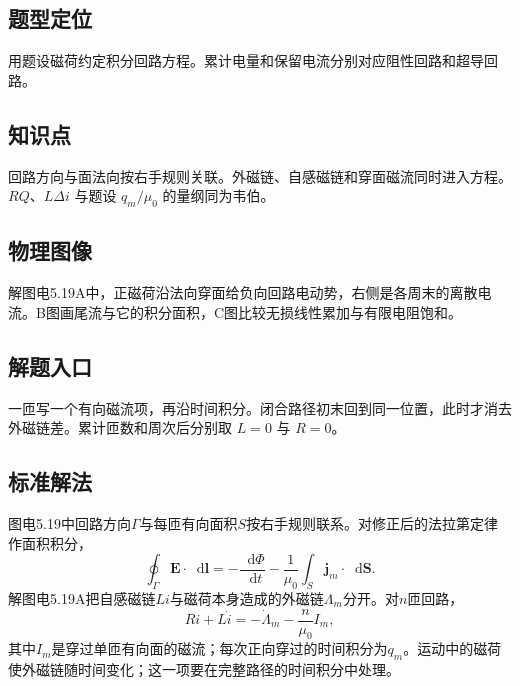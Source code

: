 \documentclass[UTF8,fontset=fandol,a4paper,11pt]{ctexart}
\newcommand{\dd}{\mathop{}\!\mathrm{d}}
\newcommand{\vect}[1]{\bm{#1}}
\begin{document}


\subsection*{题型定位}

用题设磁荷约定积分回路方程。累计电量和保留电流分别对应阻性回路和超导回路。



\subsection*{知识点}

回路方向与面法向按右手规则关联。外磁链、自感磁链和穿面磁流同时进入方程。$RQ$、$L\Delta i$ 与题设 $q_m/\mu_0$ 的量纲同为韦伯。



\subsection*{物理图像}

解图电5.19A中，正磁荷沿法向穿面给负向回路电动势，右侧是各周末的离散电流。B图画尾流与它的积分面积，C图比较无损线性累加与有限电阻饱和。



\subsection*{解题入口}

一匝写一个有向磁流项，再沿时间积分。闭合路径初末回到同一位置，此时才消去外磁链差。累计匝数和周次后分别取 $L=0$ 与 $R=0$。


\subsection*{标准解法}


图电5.19中回路方向$\Gamma$与每匝有向面积$S$按右手规则联系。对修正后的法拉第定律作面积积分，
\[
 \oint_\Gamma\vect E\cdot\dd\vect l
 =-\frac{\dd\Phi}{\dd t}-\frac1{\mu_0}
 \int_S\vect j_m\cdot\dd\vect S .
\]
解图电5.19A把自感磁链$Li$与磁荷本身造成的外磁链$\Lambda_m$分开。对$n$匝回路，
\[
 Ri+L\dot i=-\dot\Lambda_m-\frac n{\mu_0}I_m,
\]
其中$I_m$是穿过单匝有向面的磁流；每次正向穿过的时间积分为$q_m$。运动中的磁荷使外磁链随时间变化；这一项要在完整路径的时间积分中处理。
\end{document}
